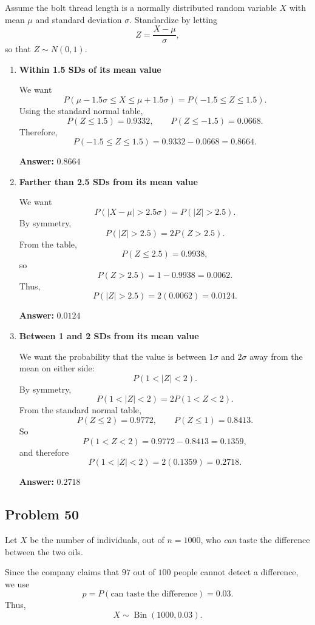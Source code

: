 Assume the bolt thread length is a normally distributed random variable $X$ with mean $\mu$ and standard deviation $\sigma$. Standardize by letting
\[
Z=\frac{X-\mu}{\sigma},
\]
so that $Z\sim N(0,1)$.

\begin{enumerate}
    \item[(a)] \textbf{Within 1.5 SDs of its mean value}

    We want
    \[
    P(\mu-1.5\sigma \le X \le \mu+1.5\sigma)
    =P(-1.5\le Z\le 1.5).
    \]
    Using the standard normal table,
    \[
    P(Z\le 1.5)=0.9332,\qquad P(Z\le -1.5)=0.0668.
    \]
    Therefore,
    \[
    P(-1.5\le Z\le 1.5)=0.9332-0.0668=0.8664.
    \]

    \textbf{Answer:} $0.8664$

    \item[(b)] \textbf{Farther than 2.5 SDs from its mean value}

    We want
    \[
    P(|X-\mu|>2.5\sigma)=P(|Z|>2.5).
    \]
    By symmetry,
    \[
    P(|Z|>2.5)=2P(Z>2.5).
    \]
    From the table,
    \[
    P(Z\le 2.5)=0.9938,
    \]
    so
    \[
    P(Z>2.5)=1-0.9938=0.0062.
    \]
    Thus,
    \[
    P(|Z|>2.5)=2(0.0062)=0.0124.
    \]

    \textbf{Answer:} $0.0124$

    \item[(c)] \textbf{Between 1 and 2 SDs from its mean value}

    We want the probability that the value is between $1\sigma$ and $2\sigma$ away from the mean on either side:
    \[
    P(1<|Z|<2).
    \]
    By symmetry,
    \[
    P(1<|Z|<2)=2P(1<Z<2).
    \]
    From the standard normal table,
    \[
    P(Z\le 2)=0.9772,\qquad P(Z\le 1)=0.8413.
    \]
    So
    \[
    P(1<Z<2)=0.9772-0.8413=0.1359,
    \]
    and therefore
    \[
    P(1<|Z|<2)=2(0.1359)=0.2718.
    \]

    \textbf{Answer:} $0.2718$
\end{enumerate}

\subsection*{Problem 50}

Let $X$ be the number of individuals, out of $n=1000$, who \emph{can} taste the difference between the two oils.

Since the company claims that $97$ out of $100$ people cannot detect a difference, we use
\[
p=P(\text{can taste the difference})=0.03.
\]
Thus,
\[
X\sim \operatorname{Bin}(1000,0.03).
\]

